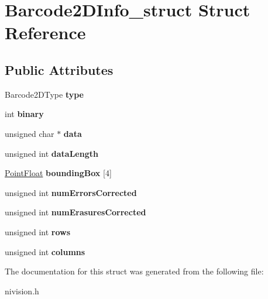 \hypertarget{structBarcode2DInfo__struct}{
\section{Barcode2DInfo\_\-struct Struct Reference}
\label{structBarcode2DInfo__struct}
}
\subsection*{Public Attributes}
\begin{DoxyCompactItemize}
\item 
\hypertarget{structBarcode2DInfo__struct_a01daab14f9ff1ce4c575dfd867e54205}{
Barcode2DType {\bfseries type}}
\label{structBarcode2DInfo__struct_a01daab14f9ff1ce4c575dfd867e54205}

\item 
\hypertarget{structBarcode2DInfo__struct_a84123be485339f60f3cd39dc63eea3a3}{
int {\bfseries binary}}
\label{structBarcode2DInfo__struct_a84123be485339f60f3cd39dc63eea3a3}

\item 
\hypertarget{structBarcode2DInfo__struct_a58bcfdd1694eaa1b72f7ae8abc60de8b}{
unsigned char $\ast$ {\bfseries data}}
\label{structBarcode2DInfo__struct_a58bcfdd1694eaa1b72f7ae8abc60de8b}

\item 
\hypertarget{structBarcode2DInfo__struct_a788479ecb10e0904a8b160c2c48aa46a}{
unsigned int {\bfseries dataLength}}
\label{structBarcode2DInfo__struct_a788479ecb10e0904a8b160c2c48aa46a}

\item 
\hypertarget{structBarcode2DInfo__struct_a29ee1c1dd6570af71deae145a4ce7855}{
\hyperlink{structPointFloat__struct}{PointFloat} {\bfseries boundingBox} \mbox{[}4\mbox{]}}
\label{structBarcode2DInfo__struct_a29ee1c1dd6570af71deae145a4ce7855}

\item 
\hypertarget{structBarcode2DInfo__struct_aec3da9c46310f2498beebb79f9e0900f}{
unsigned int {\bfseries numErrorsCorrected}}
\label{structBarcode2DInfo__struct_aec3da9c46310f2498beebb79f9e0900f}

\item 
\hypertarget{structBarcode2DInfo__struct_abb4031a1e719dd7c29c2a8c2027698a7}{
unsigned int {\bfseries numErasuresCorrected}}
\label{structBarcode2DInfo__struct_abb4031a1e719dd7c29c2a8c2027698a7}

\item 
\hypertarget{structBarcode2DInfo__struct_aef3fe4394b9bd6a43408a7f694fd42d2}{
unsigned int {\bfseries rows}}
\label{structBarcode2DInfo__struct_aef3fe4394b9bd6a43408a7f694fd42d2}

\item 
\hypertarget{structBarcode2DInfo__struct_a49ceb122774dfa88411d277a72815361}{
unsigned int {\bfseries columns}}
\label{structBarcode2DInfo__struct_a49ceb122774dfa88411d277a72815361}

\end{DoxyCompactItemize}


The documentation for this struct was generated from the following file:\begin{DoxyCompactItemize}
\item 
nivision.h\end{DoxyCompactItemize}
